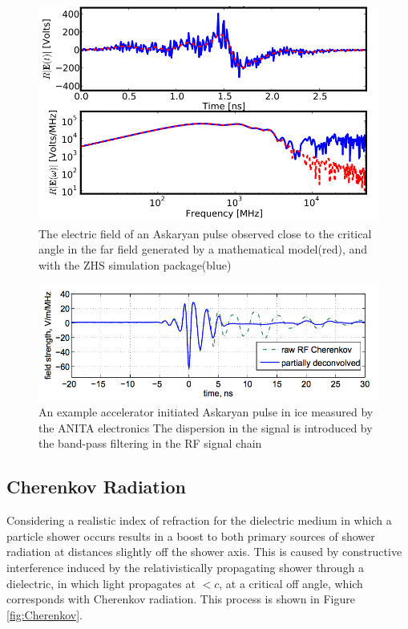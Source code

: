 		
\begin{figure}
\centering
	\includegraphics[width=\textwidth]{figures/AskaryanSimulation}
	\caption{The electric field of an Askaryan pulse observed close to the critical angle in the far field generated by a mathematical model(red), and with the ZHS simulation package(blue) \cite{PhysRevD.84.103003} }
	\label{fig:AskaryanSimulation}
\end{figure}

\begin{figure}
\centering
	\includegraphics[width=\textwidth]{figures/ANITASLACImpulse}
	\caption{An example accelerator initiated Askaryan pulse in ice measured by the ANITA electronics  The dispersion in the signal is introduced by the band-pass filtering in the RF signal chain\cite{PhysRevLett.99.171101} }
	\label{fig:ANITASLACPulse}
\end{figure}


	\subsection{Cherenkov Radiation}
		Considering a realistic index of refraction for the dielectric medium in which a particle shower occurs results in a boost to both primary sources of shower radiation at distances slightly off the shower axis.  This is caused by constructive interference induced by the relativistically propagating shower through a dielectric, in which light propagates at $<c$, at a critical off angle, which corresponds with Cherenkov radiation.  This process is shown in Figure \ref{fig:Cherenkov}.
		

